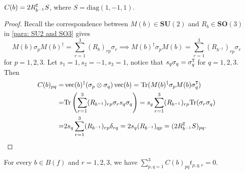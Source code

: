 \begin{lemma}\label{lm: Cb and Rb}
    $C(b)=2R_{b^{-1}}^{\tt T}S$, where $S=\mathrm{diag}(1,-1,1).$
\end{lemma}
\begin{proof}
    Recall the correspondence between $M(b)\in\mathbf{SU}(2)$ and $R_b\in \mathbf{SO}(3)$ in \cref{para: SU2 and SO3} gives
    $$M(b) \sigma_pM(b)^\dagger=\sum_{r=1}^3(R_b)_{rp}\sigma_r\implies M(b)^\dagger\sigma_pM(b)=\sum_{r=1}^3(R_{b^{-1}})_{rp}\sigma_r$$ 
    for $p=1,2,3.$
    Let $s_1=1, s_2=-1, s_3=1$, notice that $s_q\sigma_q=\sigma_q^{\tt T}$ for $q=1,2,3.$
    Then
    \begin{equation*}
        \begin{aligned}
            C(b)_{pq}=&\operatorname{vec}(b)^\dagger(\sigma_p\otimes\sigma_q) \operatorname{vec}(b)=\mathrm{Tr}(M(b)^\dagger \sigma_p M(b)\sigma_q^{\tt T})\\
            =&\mathrm{Tr}\left(\sum_{r=1}^3(R_{b^{-1}})_{rp}\sigma_rs_q\sigma_q\right)
            =s_q \sum_{r=1}^3 (R_{b^{-1}})_{rp}\mathrm{Tr}(\sigma_r\sigma_q)\\
            =&2s_q \sum_{r=1}^3 (R_{b^{-1}})_{rp}\delta_{rq}
            =2s_q(R_{b^{-1}})_{qp}
            =(2R_{b^{-1}}^{\tt T}S)_{pq}.
        \end{aligned}
    \end{equation*}
\end{proof}

\begin{lemma}\label{lm: Pauli slice}
    For every $b\in B(f)$ and $r=1,2,3$, we have $\sum_{p,q=1}^3C(b)_{pq}t_{p,q,r}=0.$
\end{lemma}

